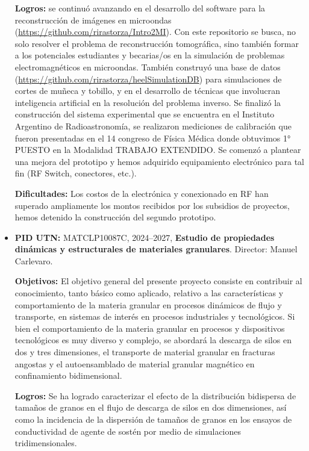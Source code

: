 \documentclass[a4paper,11pt,twoside,final,titlepage,onecolumn,openright]{report}
\begin{document}
\begin{itemize}
    \textbf{Logros:} se continuó avanzando en el desarrollo del software para la reconstrucción de imágenes en microondas (\href{https://github.com/rirastorza/Intro2MI}{https://github.com/rirastorza/Intro2MI}). Con este repositorio se busca, no solo resolver el problema de reconstrucción tomográfica, sino también formar a los potenciales estudiantes y becarias/os en la simulación de problemas electromagnéticos en microondas. También construyó una base de datos (\href{https://github.com/rirastorza/heelSimulationDB}{https://github.com/rirastorza/heelSimulationDB}) para simulaciones de cortes de muñeca y tobillo, y en el desarrollo de técnicas que involucran inteligencia artificial en la resolución del problema inverso. Se finalizó la construcción del sistema experimental que se encuentra en el Instituto Argentino de Radioastronomía, se realizaron mediciones de calibración que fueron presentadas en el 14 congreso de Física Médica donde obtuvimos 1° PUESTO en la Modalidad TRABAJO EXTENDIDO. Se comenzó a plantear una mejora del prototipo y hemos adquirido equipamiento electrónico para tal fin (RF Switch, conectores, etc.).

    \textbf{Dificultades:} Los costos de la electrónica y conexionado en RF han superado ampliamente los montos recibidos por los subsidios de proyectos, hemos detenido la construcción del segundo prototipo.

  \item \textbf{PID UTN:} MATCLP10087C, 2024--2027, \textbf{Estudio de propiedades dinámicas y estructurales de materiales granulares}. Director: Manuel Carlevaro.

    \textbf{Objetivos:} El objetivo general del presente proyecto consiste en contribuir al conocimiento, tanto básico como aplicado, relativo a las características y comportamiento de la materia granular en procesos dinámicos de flujo y transporte, en sistemas de interés en procesos industriales y tecnológicos. Si bien el comportamiento de la materia granular en procesos y dispositivos tecnológicos es muy diverso y complejo, se abordará la descarga de silos en dos y tres dimensiones, el transporte de material granular en fracturas angostas y el autoensamblado de material granular magnético en confinamiento bidimensional.

    \textbf{Logros:} Se ha logrado caracterizar el efecto de la distribución bidispersa de tamaños de granos en el flujo de descarga de silos en dos dimensiones, así como la incidencia de la dispersión de tamaños de granos en los ensayos de conductividad de agente de sostén por medio de simulaciones tridimensionales.


\end{itemize}
\end{document}
